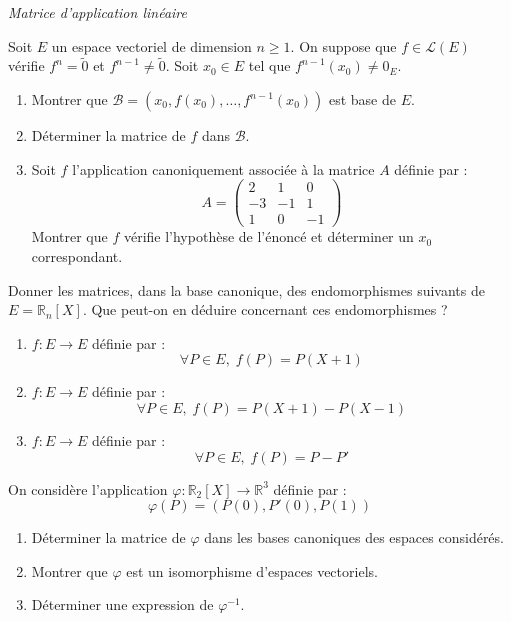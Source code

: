 \documentclass[a4paper,10pt]{report}
\begin{document}
 \medskip

\begin{center}
\textit{{ {\large Matrice d'application linéaire}}}
\end{center}

\medskip





\begin{Exercice}{} Soit $E$ un espace vectoriel de dimension $n \geq 1$. On suppose que $f \in \mathcal{L}(E)$ vérifie $f^n = \tilde{0}$ et $f^{n-1} \neq \tilde{0}$. Soit $x_0 \in E$ tel que $f^{n-1}(x_0) \neq 0_E$.

\begin{enumerate}
\item Montrer que $\mathcal{B}= (x_0, f(x_0), \ldots, f^{n-1}(x_0))$ est base de $E$. 
\item Déterminer la matrice de $f$ dans $\mathcal{B}$.
\item Soit $f$ l'application canoniquement associée à la matrice $A$ définie par :
$$ A = \begin{pmatrix}
2 & 1 & 0 \\
-3 & -1 & 1 \\
1 & 0 & -1 
\end{pmatrix}$$
Montrer que $f$ vérifie l'hypothèse de l'énoncé et déterminer un $x_0$ correspondant.
\end{enumerate}
\end{Exercice}

\begin{Exercice}{} Donner les matrices, dans la base canonique, des endomorphismes suivants de $E=\mathbb{R}_n[X]$. Que peut-on en déduire concernant ces endomorphismes ?

\begin{enumerate}
\item $f : E \rightarrow E$ définie par :
$$ \forall P \in E, \; f(P) = P(X+1) $$
\item $f : E \rightarrow E$ définie par :
$$ \forall P \in E, \; f(P) = P(X+1)-P(X-1) $$
\item $f : E \rightarrow E$ définie par :
$$ \forall P \in E, \; f(P) = P-P' $$
\end{enumerate}
\end{Exercice} 


\begin{Exercice}{} On considère l'application $\varphi : \mathbb{R}_2[X] \rightarrow \mathbb{R}^3$ définie par :
\[ \varphi(P)=(P(0),P'(0),P(1)) \]

\begin{enumerate}
\item Déterminer la matrice de $\varphi$ dans les bases canoniques des espaces considérés.
\item Montrer que $\varphi$ est un isomorphisme d'espaces vectoriels.
\item Déterminer une expression de $\varphi^{-1}$.
\end{enumerate}
\end{Exercice} 
\end{document}
